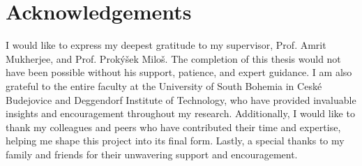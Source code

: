 \chapter*{Acknowledgements}

I would like to express my deepest gratitude to my supervisor, Prof. Amrit Mukherjee, and Prof. Prokýšek Miloš. The completion of this thesis would not have been possible without his support, patience, and expert guidance. I am also grateful to the entire faculty at the University of South Bohemia in Ceské Budejovice and Deggendorf Institute of Technology, who have provided invaluable insights and encouragement throughout my research. Additionally, I would like to thank my colleagues and peers who have contributed their time and expertise, helping me shape this project into its final form. Lastly, a special thanks to my family and friends for their unwavering support and encouragement.
